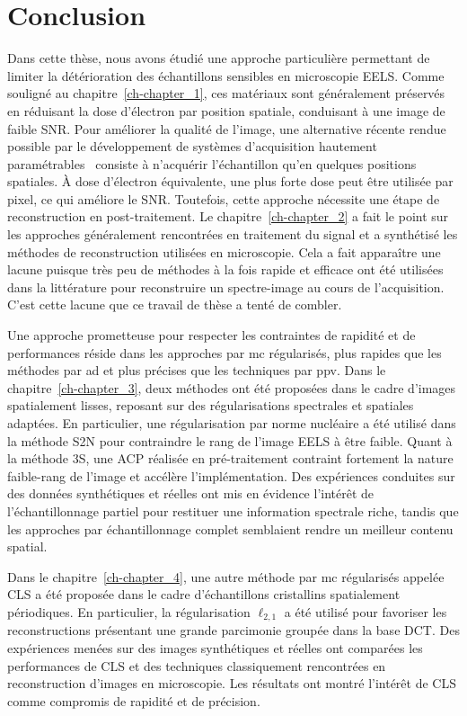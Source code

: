 \chapter{Conclusion}\label{chap-conclusion}

Dans cette thèse, nous avons étudié une approche particulière permettant de limiter la détérioration des échantillons sensibles en microscopie EELS. Comme souligné au chapitre~\ref{ch-chapter_1}, ces matériaux sont généralement préservés en réduisant la dose d'électron par position spatiale, conduisant à une image de faible SNR. 
%
Pour améliorer la qualité de l'image, une alternative récente rendue possible par le développement de systèmes d'acquisition hautement paramétrables~\cite{tararan2016random, zobelli2019spatial, tence2019following} consiste à n'acquérir l'échantillon qu’en quelques positions spatiales. \`A dose d'électron équivalente, une plus forte dose peut être utilisée par pixel, ce qui améliore le SNR. Toutefois, cette approche nécessite une étape de reconstruction en post-traitement. 
%
Le chapitre~\ref{ch-chapter_2} a fait le point sur les approches généralement rencontrées en traitement du signal et a synthétisé les méthodes de reconstruction utilisées en microscopie. Cela a fait apparaître une lacune puisque très peu de méthodes à la fois rapide et efficace ont été utilisées dans la littérature pour reconstruire un spectre-image au cours de l'acquisition. C'est cette lacune que ce travail de thèse a tenté de combler.

Une approche prometteuse pour respecter les contraintes de rapidité et de performances réside dans les approches par \gls{mc} régularisés, plus rapides que les méthodes par \gls{ad} et plus précises que les techniques par \gls{ppv}. Dans le chapitre~\ref{ch-chapter_3}, deux méthodes ont été proposées dans le cadre d'images spatialement lisses, reposant sur des régularisations spectrales et spatiales adaptées. En particulier, une régularisation par norme nucléaire a été utilisé dans la méthode S2N pour contraindre le rang de l'image EELS à être faible. Quant à la méthode 3S, une ACP réalisée en pré-traitement contraint fortement la nature faible-rang de l'image et accélère l'implémentation. Des expériences conduites sur des données synthétiques et réelles ont mis en évidence l'intérêt de l'échantillonnage partiel pour restituer une information spectrale riche, tandis que les approches par échantillonnage complet semblaient rendre un meilleur contenu spatial.

Dans le chapitre~\ref{ch-chapter_4}, une autre méthode par \gls{mc} régularisés appelée CLS a été proposée dans le cadre d'échantillons cristallins spatialement périodiques. En particulier, la régularisation $\ell_{2,1}$ a été utilisé pour favoriser les reconstructions présentant une grande parcimonie groupée dans la base DCT. Des expériences menées sur des images synthétiques et réelles ont comparées les performances de CLS et des techniques classiquement rencontrées en reconstruction d'images en microscopie. Les résultats ont montré l'intérêt de CLS comme compromis de rapidité et de précision.


